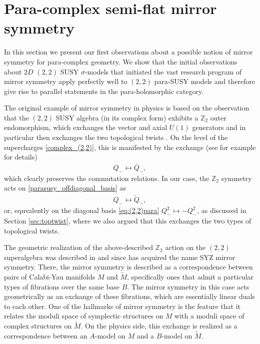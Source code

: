 \documentclass[letterpaper,12pt]{article}
\newcommand{\Mt}{\tl{M}}
\def\tl{\tilde}
\theoremstyle{definition}
\theoremstyle{remark}
\theoremstyle{examples}
\begin{document}
\section{Para-complex semi-flat mirror symmetry}
In this section we present our first observations about a possible notion of mirror symmetry for para-complex geometry. We show that the initial observations about $2D$ $(2,2)$ SUSY $\sigma$-models that initiated the vast research program of mirror symmetry apply perfectly well to $(2,2)$ para-SUSY models and therefore give rise to parallel statements in the para-holomorphic category.

The original example of mirror symmetry in physics is based on the observation that the $(2,2)$ SUSY algebra (in its complex form) exhibits a $\mathbb{Z}_2$ outer endomorphism, which exchanges the vector and axial $U(1)$ generators and in particular then exchanges the two topological twists \cite{Witten_mirror_topological}. On the level of the supercharges \eqref{complex_(2,2)}, this is manifested by the exchange (see for example \cite{susy_hori} for details)
\begin{align*}
Q_-\longleftrightarrow \overline{Q}_-,
\end{align*}
which clearly preserves the commutation relations. In our case, the $\mathbb{Z}_2$ symmetry acts on \eqref{parasusy_offdiagonal_basis} as
\begin{align*}
Q_-\longleftrightarrow \widetilde{Q}_-,
\end{align*}
or, equvalently on the diagonal basis \eqref{eq:(2,2)para} $Q^2_-\mapsto -Q^2_-$, as discussed in Section \ref{sec:toptwist}, where we also argued that this exchanges the two types of topological twists.

The geometric realization of the above-described $\mathbb{Z}_2$ action on the $(2,2)$ superalgebra was described in \cite{SYZ} and since has acquired the name SYZ mirror symmetry. There, the mirror symmetry is described as a correspondence between pairs of Calabi-Yau manifolds $M$ and $\Mt$, specifically ones that admit a particular types of fibrations over the same base $B$. The mirror symmetry in this case acts geometrically as an exchange of these fibrations, which are essentially linear duals to each other. One of the hallmarks of mirror symmetry is the feature that it relates the moduli space of symplectic structures on $M$ with a moduli space of complex structures on $\Mt$. On the physics side, this exchange is realized as a correspondence between an $A$-model on $M$ and a $B$-model on $\Mt$.
\end{document}
